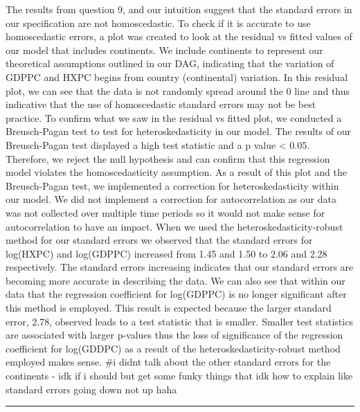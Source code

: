 \documentclass[
]{article}
\begin{document}
The results from question 9, and our intuition suggest that the standard
errors in our specification are not homoscedastic. To check if it is
accurate to use homoscedastic errors, a plot was created to look at the
residual vs fitted values of our model that includes continents. We
include continents to represent our theoretical assumptions outlined in
our DAG, indicating that the variation of GDPPC and HXPC begins from
country (continental) variation. In this residual plot, we can see that
the data is not randomly spread around the 0 line and thus indicative
that the use of homoscedastic standard errors may not be best practice.
To confirm what we saw in the residual vs fitted plot, we conducted a
Breusch-Pagan test to test for heteroskedasticity in our model. The
results of our Breusch-Pagan test displayed a high test statistic and a
p value \textless{} 0.05. Therefore, we reject the null hypothesis and
can confirm that this regression model violates the homoscedasticity
assumption. As a result of this plot and the Breusch-Pagan test, we
implemented a correction for heteroskedasticity within our model. We did
not implement a correction for autocorrelation as our data was not
collected over multiple time periods so it would not make sense for
autocorrelation to have an impact. When we used the
heteroskedasticity-robust method for our standard errors we observed
that the standard errors for log(HXPC) and log(GDPPC) increased from
1.45 and 1.50 to 2.06 and 2.28 respectively. The standard errors
increasing indicates that our standard errors are becoming more accurate
in describing the data. We can also see that within our data that the
regression coefficient for log(GDPPC) is no longer significant after
this method is employed. This result is expected because the larger
standard error, 2.78, observed leads to a test statistic that is
smaller. Smaller test statistics are associated with larger p-values
thus the loss of significance of the regression coefficient for
log(GDDPC) as a result of the heteroskedasticity-robust method employed
makes sense. \#i didnt talk about the other standard errors for the
continents - idk if i should but get some funky things that idk how to
explain like standard errors going down not up haha

\begin{center}\rule{0.5\linewidth}{0.5pt}\end{center}
\end{document}
